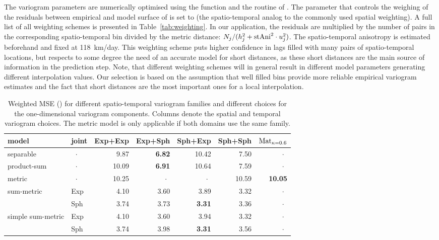 The variogram parameters are numerically optimised using the function  and the  routine of . The parameter  that controls the weighing of the residuals between empirical and model surface of  is set to  (the spatio-temporal analog to the commonly used spatial weighting). A full list of all weighting schemes is presented in Table~\ref{tab:weighting}. In our application, the residuals are multiplied by the number of pairs in the corresponding spatio-temporal bin divided by the metric distance: $N_j/(h_j^2 + {\rm stAni}^2\cdot u_j^2)$. The spatio-temporal anisotropy is estimated beforehand and fixed at 118~km/day. This weighting scheme puts higher confidence in lags filled with many pairs of spatio-temporal locations, but respects to some degree the need of an accurate model for short distances, as these short distances are the main source of information in the prediction step. Note, that different weighting schemes will in general result in different model parameters generating different interpolation values. Our selection is based on the assumption that well filled bins provide more reliable empirical variogram estimates and the fact that short distances are the most important ones for a local interpolation.

\begin{table}[t!]
\centering
\caption{Weighted MSE () for different spatio-temporal variogram families and different choices for the one-dimensional variogram components. Columns denote the spatial and temporal variogram choices. The metric model is only applicable if both domains use the same family.}\label{tab:vgmFits}
\begin{tabular}{ll|rrrrr}
\toprule
model & joint & Exp+Exp & Exp+Sph & Sph+Exp & Sph+Sph & ${\rm Mat}_{\kappa=0.6}$ \\ \midrule  
{separable} & $~~\cdot$ & 9.87 & \bf{6.82} & 10.42 & 7.50 & $\cdot~~$ \\
{product-sum} & $~~\cdot$ & 10.09 & \bf{6.91} & 10.64 & 7.59 & $\cdot~~$ \\
{metric} & $~~\cdot$ & 10.25 & $\cdot~~$ & $\cdot~~$ & 10.59 & \bf{10.05} \\
\multirow{2}{*}{sum-metric} & Exp &  4.10 & 3.60 & 3.89 & 3.32 & $\cdot~~$ \\
& Sph & 3.74 & 3.73 & \bf{3.31} & 3.36 & $\cdot~~$ \\
\multirow{2}{*}{simple sum-metric}& Exp &  4.10 & 3.60 & 3.94 & 3.32 & $\cdot~~$ \\
& Sph & 3.74 & 3.98 & \bf{3.31} & 3.56 & $\cdot~~$ \\ \bottomrule
\end{tabular}
\end{table}

